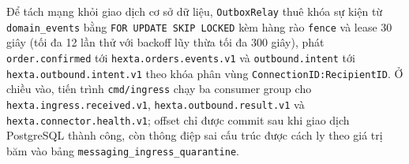 Để tách mạng khỏi giao dịch cơ sở dữ liệu, \texttt{OutboxRelay} thuê khóa sự kiện từ \texttt{domain\_\hspace{0pt}events} bằng \texttt{FOR UPDATE SKIP LOCKED} kèm hàng rào \texttt{fence}
và lease 30 giây (tối đa 12 lần thử với backoff lũy thừa tối đa 300 giây), phát \texttt{order.\hspace{0pt}confirmed} tới \texttt{hexta.\hspace{0pt}orders.\hspace{0pt}events.\hspace{0pt}v1} và \texttt{outbound.\hspace{0pt}intent} tới
\texttt{hexta.\hspace{0pt}outbound.\hspace{0pt}intent.\hspace{0pt}v1} theo khóa phân vùng \texttt{ConnectionID:\hspace{0pt}RecipientID}.
Ở chiều vào, tiến trình \texttt{cmd/\hspace{0pt}ingress} chạy ba consumer group cho \texttt{hexta.\hspace{0pt}ingress.\hspace{0pt}received.\hspace{0pt}v1}, \texttt{hexta.\hspace{0pt}outbound.\hspace{0pt}result.\hspace{0pt}v1} và
\texttt{hexta.\hspace{0pt}connector.\hspace{0pt}health.\hspace{0pt}v1}; offset chỉ được commit sau khi giao dịch PostgreSQL thành công, còn thông điệp sai cấu trúc được cách ly theo giá trị băm vào bảng
\texttt{messaging\_\hspace{0pt}ingress\_\hspace{0pt}quarantine}.

